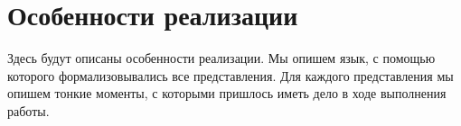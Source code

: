 \section{Особенности реализации}

Здесь будут описаны особенности реализации. Мы опишем язык, с помощью которого формализовывались все представления. Для каждого представления мы опишем тонкие моменты, с которыми пришлось иметь дело в ходе выполнения работы.


